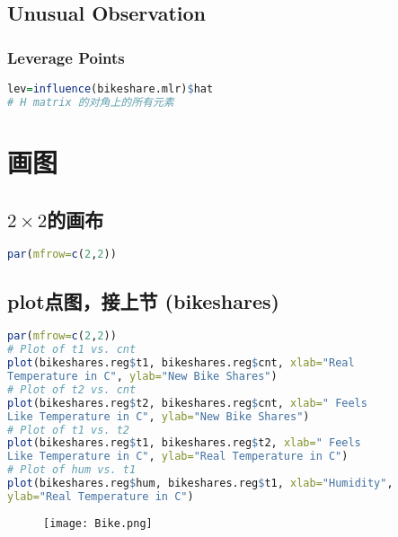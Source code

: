 \documentclass[11pt,a4paper]{article}
\begin{document}
\subsection{Unusual Observation}
\subsubsection{Leverage Points}
\begin{lstlisting}[language=R]
lev=influence(bikeshare.mlr)$hat
# H matrix 的对角上的所有元素
\end{lstlisting}

































\section{画图}

\subsection{$2\times2$的画布}
\begin{lstlisting}[language=R]
par(mfrow=c(2,2))
\end{lstlisting}
\subsection{plot点图，接上节 (bikeshares)}
\begin{lstlisting}[language=R]
par(mfrow=c(2,2))
# Plot of t1 vs. cnt
plot(bikeshares.reg$t1, bikeshares.reg$cnt, xlab="Real
Temperature in C", ylab="New Bike Shares")
# Plot of t2 vs. cnt
plot(bikeshares.reg$t2, bikeshares.reg$cnt, xlab=" Feels
Like Temperature in C", ylab="New Bike Shares")
# Plot of t1 vs. t2
plot(bikeshares.reg$t1, bikeshares.reg$t2, xlab=" Feels
Like Temperature in C", ylab="Real Temperature in C")
# Plot of hum vs. t1
plot(bikeshares.reg$hum, bikeshares.reg$t1, xlab="Humidity",
ylab="Real Temperature in C")
\end{lstlisting}
\begin{center}\begin{figure}[htbp]
    \centering
    \texttt{[image: Bike.png]}
    \caption{}
    \label{}
\end{figure}\end{center}
\end{document}
